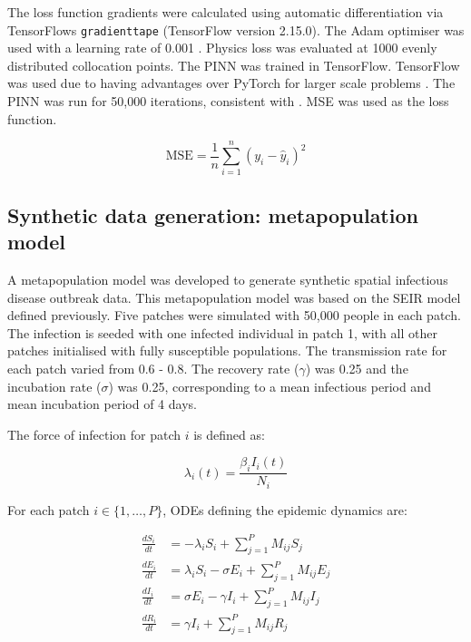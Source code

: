 \documentclass{article}
\begin{document}
The loss function gradients were calculated using automatic differentiation via TensorFlows \texttt{gradienttape} (TensorFlow version 2.15.0). The Adam optimiser was used with a learning rate of 0.001 \parencite{https://doi.org/10.48550/arxiv.1412.6980}. Physics loss was evaluated at 1000 evenly distributed collocation points. The PINN was trained in TensorFlow. TensorFlow was used due to having advantages over PyTorch for larger scale problems \parencite{bafghi2024comparing}. The PINN was run for 50,000 iterations, consistent with \parencite{Qian2025}. MSE was used as the loss function.

\begin{equation}
\mathrm{MSE}=\frac{1}{n}\sum_{i=1}^{n}(y_i-\hat{y}_i)^2
\end{equation}

\subsection{Synthetic data generation: metapopulation model}
A metapopulation model was developed to generate synthetic spatial infectious disease outbreak data. This metapopulation model was based on the SEIR model defined previously. Five patches were simulated with 50,000 people in each patch. The infection is seeded with one infected individual in patch 1, with all other patches initialised with fully susceptible populations. The transmission rate for each patch varied from 0.6 - 0.8.  The recovery rate ($\gamma$) was 0.25 and the incubation rate ($\sigma$) was 0.25, corresponding to a mean infectious period and mean incubation period of 4 days.

The force of infection for patch $i$ is defined as:

\begin{equation}
    \lambda_i(t) = \frac{\beta_i I_i(t)}{N_i}
\end{equation}


For each patch $i \in \{1, \dots, P\}$, ODEs defining the epidemic dynamics are:

\begin{align}
    \frac{dS_i}{dt} &= -\lambda_i S_i + \sum_{j=1}^{P} M_{ij} S_j \\[6pt]
    \frac{dE_i}{dt} &= \lambda_i S_i - \sigma E_i + \sum_{j=1}^{P} M_{ij} E_j \\[6pt]
    \frac{dI_i}{dt} &= \sigma E_i - \gamma I_i + \sum_{j=1}^{P} M_{ij} I_j \\[6pt]
    \frac{dR_i}{dt} &= \gamma I_i + \sum_{j=1}^{P} M_{ij} R_j
\end{align}
\end{document}
